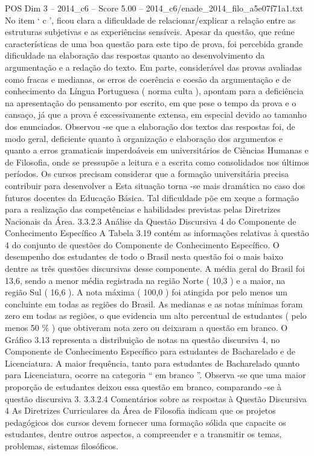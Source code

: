 \begin{textsample}{POS Dim 3 – 2014\_c6 – Score 5.00 – 2014\_c6/enade\_2014\_filo\_a5e07f71a1.txt}
No item ‘ c ’, ficou clara a dificuldade de relacionar/explicar a relação entre as estruturas subjetivas e as experiências sensíveis.
Apesar da questão, que reúne características de uma boa questão para este tipo de prova, foi percebida grande dificuldade na elaboração das respostas quanto ao desenvolvimento da argumentação e a redação do texto.
Em parte, considerável das provas avaliadas como fracas e medianas, os erros de coerência e coesão da argumentação e de conhecimento da Língua Portuguesa ( norma culta ), apontam para a deficiência na apresentação do pensamento por escrito, em que pese o tempo da prova e o cansaço, já que a prova é excessivamente extensa, em especial devido ao tamanho dos enunciados.
Observou -se que a elaboração dos textos das respostas foi, de modo geral, deficiente quanto à organização e elaboração dos argumentos e quanto a erros gramaticais imperdoáveis em universitários de Ciências Humanas e de Filosofia, onde se pressupõe a leitura e a escrita como consolidados nos últimos períodos.
Os cursos precisam considerar que a formação universitária precisa contribuir para desenvolver a Esta situação torna -se mais dramática no caso dos futuros docentes da Educação Básica.
Tal dificuldade põe em xeque a formação para a realização das competências e habilidades previstas pelas Diretrizes Nacionais da Área. 3.3.2.3 Análise da Questão Discursiva 4 do Componente de Conhecimento Específico A Tabela 3.19 contém as informações relativas à questão 4 do conjunto de questões do Componente de Conhecimento Específico.
O desempenho dos estudantes de todo o Brasil nesta questão foi o mais baixo dentre as três questões discursivas desse componente.
A média geral do Brasil foi 13,6, sendo a menor média registrada na região Norte ( 10,3 ) e a maior, na região Sul ( 16,6 ).
A nota máxima ( 100,0 ) foi atingida por pelo menos um concluinte em todas as regiões do Brasil.
As medianas e as notas mínimas foram zero em todas as regiões, o que evidencia um alto percentual de estudantes ( pelo menos 50 \% ) que obtiveram nota zero ou deixaram a questão em branco.
O Gráfico 3.13 representa a distribuição de notas na questão discursiva 4, no Componente de Conhecimento Específico para estudantes de Bacharelado e de Licenciatura.
A maior frequência, tanto para estudantes de Bacharelado quanto para Licenciatura, ocorre na categoria “ em branco ”.
Observa -se que uma maior proporção de estudantes deixou essa questão em branco, comparando -se à questão discursiva 3. 3.3.2.4 Comentários sobre as respostas à Questão Discursiva 4 As Diretrizes Curriculares da Área de Filosofia indicam que os projetos pedagógicos dos cursos devem fornecer uma formação sólida que capacite os estudantes, dentre outros aspectos, a compreender e a transmitir os temas, problemas, sistemas filosóficos.

\end{textsample}
